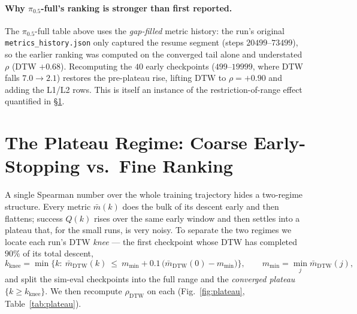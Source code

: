 \documentclass[11pt]{article}
\begin{document}
\paragraph{Why $\pi_{0.5}$-full's ranking is stronger than first reported.}
The $\pi_{0.5}$-full table above uses the \emph{gap-filled} metric history: the run's original
\texttt{metrics\_history.json} only captured the resume segment (steps $20499$--$73499$), so the
earlier ranking was computed on the converged tail alone and understated $\rho$ (DTW $+0.68$). Recomputing
the $40$ early checkpoints ($499$--$19999$, where DTW falls $7.0\!\to\!2.1$) restores the pre-plateau rise,
lifting DTW to $\rho=+0.90$ and adding the L1/L2 rows. This is itself an instance of the
restriction-of-range effect quantified in \S\ref{sec:plateau}.

\section{The Plateau Regime: Coarse Early-Stopping vs.\ Fine Ranking}
\label{sec:plateau}

A single Spearman number over the whole training trajectory hides a two-regime structure. Every metric
$\bar m(k)$ does the bulk of its descent early and then flattens; success $Q(k)$ rises over the same
early window and then settles into a plateau that, for the small runs, is very noisy. To separate the two
regimes we locate each run's DTW \emph{knee} --- the first checkpoint whose DTW has completed $90\%$ of
its total descent,
\begin{equation}
  k_{\text{knee}}=\min\Big\{k:\ \bar m_{\text{DTW}}(k)\ \le\ m_{\min}+0.1\,\big(\bar m_{\text{DTW}}(0)-m_{\min}\big)\Big\},
  \qquad m_{\min}=\min_j \bar m_{\text{DTW}}(j),
\end{equation}
and split the sim-eval checkpoints into the full range and the \emph{converged plateau}
$\{k\ge k_{\text{knee}}\}$. We then recompute $\rho_{\text{DTW}}$ on each (Fig.~\ref{fig:plateau},
Table~\ref{tab:plateau}).
\end{document}
